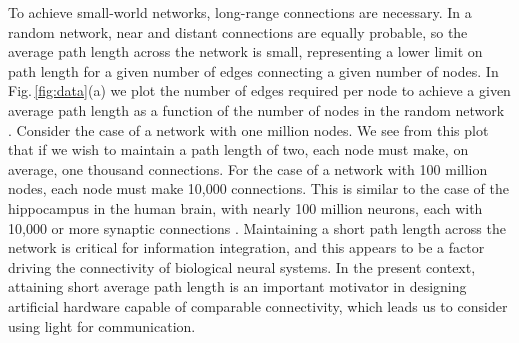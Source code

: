 \documentclass[twocolumn]{article}
\begin{document}
To achieve small-world networks, long-range connections are necessary. In a random network, near and distant connections are equally probable, so the average path length across the network is small, representing a lower limit on path length for a given number of edges connecting a given number of nodes. In Fig.\,\ref{fig:data}(a) we plot the number of edges required per node to achieve a given average path length as a function of the number of nodes in the random network \cite{shICRC2018}. Consider the case of a network with one million nodes. We see from this plot that if we wish to maintain a path length of two, each node must make, on average, one thousand connections. For the case of a network with 100 million nodes, each node must make 10,000 connections. This is similar to the case of the hippocampus in the human brain, with nearly 100 million neurons, each with 10,000 or more synaptic connections \cite{bu2006}. Maintaining a short path length across the network is critical for information integration, and this appears to be a factor driving the connectivity of biological neural systems. In the present context, attaining short average path length is an important motivator in designing artificial hardware capable of comparable connectivity, which leads us to consider using light for communication.
\end{document}
